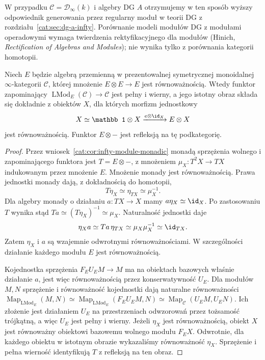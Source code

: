 \begin{przyklad}
W przypadku $\mathcal C=\mathcal D_\infty(k)$ i algebry DG $A$ otrzymujemy w ten sposób wyższy odpowiednik generowania przez regularny moduł w teorii DG z rozdziału~\ref{cat:sec:dg-a-infty}. Porównanie modeli modułów DG z modułami operadowymi wymaga twierdzenia rektyfikacyjnego dla modułów (Hinich, \emph{Rectification of Algebras and Modules}); nie wynika tylko z porównania kategorii homotopii.
\end{przyklad}

\begin{stwierdzenie}\label{cat:prop:infty-idempotent-algebra-modules}
Niech $E$ będzie algebrą przemienną w prezentowalnej symetrycznej monoidalnej $\infty$-kategorii $\mathcal C$, której mnożenie $E\otimes E\to E$ jest równoważnością. Wtedy funktor zapominający $\operatorname{LMod}_E(\mathcal C)\to\mathcal C$ jest pełny i wierny, a jego istotny obraz składa się dokładnie z obiektów $X$, dla których morfizm jednostkowy
\[
 X\simeq\mathbb 1\otimes X\xrightarrow{e\otimes\id_X}E\otimes X
\]
jest równoważnością. Funktor $E\otimes-$ jest refleksją na tę podkategorię.
\end{stwierdzenie}
\begin{proof}
Przez wniosek~\ref{cat:cor:infty-module-monadic} monadą sprzężenia wolnego i zapominającego funktora jest $T=E\otimes-$, z mnożeniem $\mu_X:T^2X\to TX$ indukowanym przez mnożenie $E$. Mnożenie monady jest równoważnością. Prawa jednostki monady dają, z dokładnością do homotopii,
\[
 T\eta_X\simeq\eta_{TX}\simeq\mu_X^{-1}.
\]
Dla algebry monady o działaniu $a:TX\to X$ mamy $a\eta_X\simeq\id_X$. Po zastosowaniu $T$ wynika stąd $Ta\simeq(T\eta_X)^{-1}\simeq\mu_X$. Naturalność jednostki daje
\[
 \eta_Xa\simeq Ta\,\eta_{TX}\simeq\mu_X\mu_X^{-1}\simeq\id_{TX}.
\]
Zatem $\eta_X$ i $a$ są wzajemnie odwrotnymi równoważnościami. W szczególności działanie każdego modułu $E$ jest równoważnością.

Kojednostka sprzężenia $F_EU_E M\to M$ ma na obiektach bazowych właśnie działanie $a$, jest więc równoważnością przez konserwatywność $U_E$. Dla modułów $M,N$ sprzężenie i równoważność kojednostki dają naturalne równoważności $\operatorname{Map}_{\operatorname{LMod}_E}(M,N)\simeq\operatorname{Map}_{\operatorname{LMod}_E}(F_EU_EM,N)\simeq\operatorname{Map}_{\mathcal C}(U_EM,U_EN)$. Ich złożenie jest działaniem $U_E$ na przestrzeniach odwzorowań przez tożsamość trójkątną, a więc $U_E$ jest pełny i wierny. Jeżeli $\eta_X$ jest równoważnością, obiekt $X$ jest równoważny obiektowi bazowemu wolnego modułu $F_E X$. Odwrotnie, dla każdego obiektu w istotnym obrazie wykazaliśmy równoważność $\eta_X$. Sprzężenie i pełna wierność identyfikują $T$ z refleksją na ten obraz.
\end{proof}


